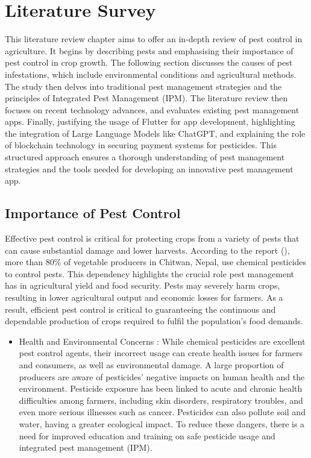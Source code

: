\chapter{Literature Survey}
This literature review chapter aims to offer an in-depth review of pest control in agriculture. It begins by describing pests and emphasising their importance of pest control in crop growth. The following section discusses the causes of pest infestations, which include environmental conditions and agricultural methods. The study then delves into traditional pest management strategies and the principles of Integrated Pest Management (IPM).
The literature review then focuses on recent technology advances, and evaluates existing pest management apps. Finally, justifying the usage of Flutter for app development, highlighting the integration of Large Language Models like ChatGPT, and explaining the role of blockchain technology in securing payment systems for pesticides. This structured approach ensures a thorough understanding of pest management strategies and the tools needed for developing an innovative pest management app.

\section{Importance of Pest Control}
Effective pest control is critical for protecting crops from a variety of pests that can cause substantial damage and lower harvests. According to the report (\cite{rijal_2018_farmers}), more than 80\% of vegetable producers in Chitwan, Nepal, use chemical pesticides to control pests. This dependency highlights the crucial role pest management has in agricultural yield and food security. Pests may severely harm crops, resulting in lower agricultural output and economic losses for farmers. As a result, efficient pest control is critical to guaranteeing the continuous and dependable production of crops required to fulfil the population's food demands.
\begin{itemize}
    \item Health and Environmental Concerns : While chemical pesticides are excellent pest control agents, their incorrect usage can create health issues for farmers and consumers, as well as environmental damage. A large proportion of producers are aware of pesticides' negative impacts on human health and the environment. Pesticide exposure has been linked to acute and chronic health difficulties among farmers, including skin disorders, respiratory troubles, and even more serious illnesses such as cancer. Pesticides can also pollute soil and water, having a greater ecological impact. To reduce these dangers, there is a need for improved education and training on safe pesticide usage and integrated pest management (IPM).
\end{itemize}

